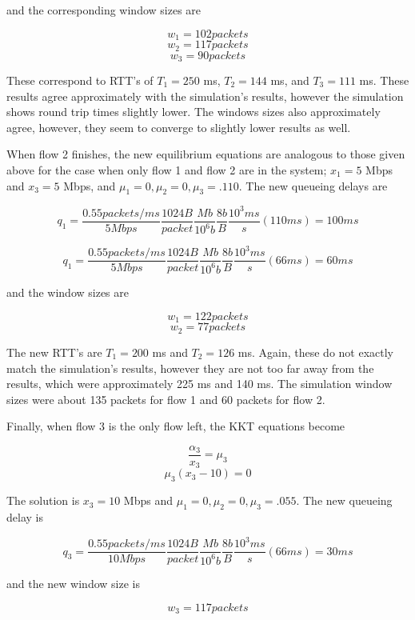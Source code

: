 and the corresponding window sizes are

$$w_1 = 102 packets$$
$$w_2 = 117 packets$$
$$w_3 = 90 packets $$

These correspond to RTT's of $T_1 = 250$ ms, $T_2 = 144$ ms, and $T_3 = 111$ ms. These results agree approximately with the simulation's results, however the simulation shows round trip times slightly lower. The windows sizes also approximately agree, however, they seem to converge to slightly lower results as well.

When flow 2 finishes, the new equilibrium equations are analogous to those given above for the case when only flow 1 and flow 2 are in the system; $x_1 = 5$ Mbps and $x_3 = 5$ Mbps, and $\mu_1 = 0, \mu_2 = 0, \mu_3 = .110$. The new queueing delays are 

$$q_1 = \frac{0.55 packets/ms}{5 Mbps} \frac{1024 B}{packet} \frac{Mb}{10^6 b} \frac{8 b}{B} \frac{10^3 ms}{s} (110 ms) = 100 ms$$

$$q_1 = \frac{0.55 packets/ms}{5 Mbps} \frac{1024 B}{packet} \frac{Mb}{10^6 b} \frac{8 b}{B} \frac{10^3 ms}{s} (66 ms) = 60 ms$$

and the window sizes are

$$w_1 = 122 packets$$
$$w_2 = 77 packets$$

The new RTT's are $T_1 = 200$ ms and $T_2 = 126$ ms. Again, these do not exactly match the simulation's results, however they are not too far away from the results, which were approximately 225 ms and 140 ms. The simulation window sizes were about 135 packets for flow 1 and 60 packets for flow 2.

Finally, when flow 3 is the only flow left, the KKT equations become

$$\frac{\alpha_3}{x_3}=\mu_3$$
$$\mu_3 (x_3 - 10) = 0$$

The solution is $x_3 = 10$ Mbps and $\mu_1 = 0, \mu_2 = 0, \mu_3 = .055$. The new queueing delay is 

$$q_3 = \frac{0.55 packets/ms}{10 Mbps} \frac{1024 B}{packet} \frac{Mb}{10^6 b} \frac{8 b}{B}  \frac{10^3 ms}{s} (66 ms) = 30 ms$$

and the new window size is

$$w_3 = 117 packets$$

